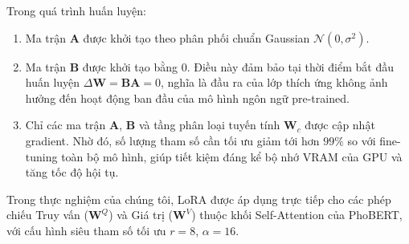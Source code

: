 Trong quá trình huấn luyện:
\begin{enumerate}
    \item Ma trận $\mathbf{A}$ được khởi tạo theo phân phối chuẩn Gaussian $\mathcal{N}(0, \sigma^2)$.
    \item Ma trận $\mathbf{B}$ được khởi tạo bằng $0$. Điều này đảm bảo tại thời điểm bắt đầu huấn luyện $\Delta \mathbf{W} = \mathbf{B}\mathbf{A} = 0$, nghĩa là đầu ra của lớp thích ứng không ảnh hưởng đến hoạt động ban đầu của mô hình ngôn ngữ pre-trained.
    \item Chỉ các ma trận $\mathbf{A}$, $\mathbf{B}$ và tầng phân loại tuyến tính $\mathbf{W}_c$ được cập nhật gradient. Nhờ đó, số lượng tham số cần tối ưu giảm tới hơn $99\%$ so với fine-tuning toàn bộ mô hình, giúp tiết kiệm đáng kể bộ nhớ VRAM của GPU và tăng tốc độ hội tụ.
\end{enumerate}
Trong thực nghiệm của chúng tôi, LoRA được áp dụng trực tiếp cho các phép chiếu Truy vấn ($\mathbf{W}^Q$) và Giá trị ($\mathbf{W}^V$) thuộc khối Self-Attention của PhoBERT, với cấu hình siêu tham số tối ưu $r=8$, $\alpha=16$.
